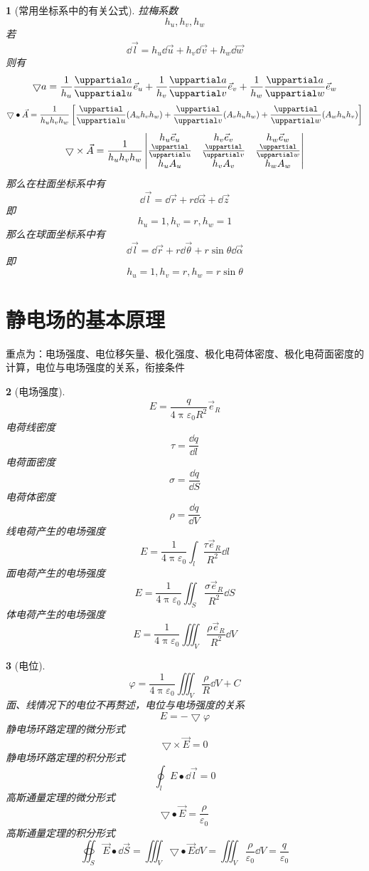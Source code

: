 \documentclass{book}
\theoremstyle{change}
\newtheorem{ti}{}[section]
\def\partial{\uppartial}
\begin{document}
\begin{ti}[常用坐标系中的有关公式]
	拉梅系数
	\[
		h_u,h_v,h_w
	\]
	若
	\[
		\dd \vec{l}=h_u\dd \vec{u}+h_v\dd \vec{v}+h_w\dd \vec{w}
	\]
	则有
	\[
		\bigtriangledown a=\frac1{h_u}\frac{\partial a}{\partial u}\vec{e}_u+\frac1{h_v}\frac{\partial a}{\partial v}\vec{e}_v+\frac1{h_w}\frac{\partial a}{\partial w}\vec{e}_w
	\]
	\[
		\bigtriangledown\bullet\vec{A}=\frac{1}{h_uh_vh_w}\left[\frac{\partial}{\partial u}(A_uh_vh_w)+\frac{\partial}{\partial v}(A_vh_uh_w)+\frac{\partial}{\partial w}(A_wh_uh_v)\right]
	\]
	\[
		\bigtriangledown\times\vec{A}=\frac{1}{h_uh_vh_w}
	\begin{vmatrix}
	h_u\vec{e}_u&h_v\vec{e}_v&h_w\vec{e}_w\\
	\frac{\partial}{\partial u}&\frac{\partial}{\partial v}&\frac{\partial}{\partial w}\\
	h_uA_u&h_vA_v&h_wA_w
	\end{vmatrix}
	\]
	那么在柱面坐标系中有
	\[
		\dd \vec{l}=\dd \vec{r}+r\dd \vec{\alpha}+\dd \vec{z}
	\]
	即
	\[
		h_u=1,h_v=r,h_w=1
	\]
	那么在球面坐标系中有
	\[
		\dd \vec{l}=\dd \vec{r}+r\dd \vec{\theta}+r\sin\theta\dd \vec{\alpha}
	\]
	即
	\[
		h_u=1,h_v=r,h_w=r\sin\theta
	\]
\end{ti}

\section{静电场的基本原理}
重点为：电场强度、电位移矢量、极化强度、极化电荷体密度、极化电荷面密度的计算，电位与电场强度的关系，衔接条件
\begin{ti}[电场强度]
\[
	E=\frac{q}{4\uppi\varepsilon_0R^2}\vec{e}_R
\]
电荷线密度
\[
	\tau=\frac{\dd q}{\dd l}
\]
电荷面密度
\[
	\sigma=\frac{\dd q}{\dd S}
\]
电荷体密度
\[
	\rho=\frac{\dd q}{\dd V}
\]
线电荷产生的电场强度
\[
	E=\frac{1}{4\uppi\varepsilon_0}\int_l{\frac{\tau\vec{e}_R}{R^2}}\dd l
\]
面电荷产生的电场强度
\[
	E=\frac{1}{4\uppi\varepsilon_0}\iint_S{\frac{\sigma\vec{e}_R}{R^2}}\dd S
	\]
体电荷产生的电场强度
\[
	E=\frac{1}{4\uppi\varepsilon_0}\iiint_{V}{\frac{\rho\vec{e}_R}{R^2}}\dd V
\]
\end{ti}

\begin{ti}[电位]
\[
	\varphi=\frac{1}{4\uppi\varepsilon_0}\iiint_{V}\frac{\rho}{R}\dd V+C
\]
面、线情况下的电位不再赘述，电位与电场强度的关系
\[
	E=-\bigtriangledown\varphi
\]
静电场环路定理的微分形式
\[
	\bigtriangledown\times\vec{E}=0
\]
静电场环路定理的积分形式
\[
	\oint_l{E\bullet\dd \vec{l}}=0
\]
高斯通量定理的微分形式
\[
	\bigtriangledown\bullet \vec{E}=\frac{\rho}{\varepsilon_0}
\]
高斯通量定理的积分形式
\[
	\oiint_{S}\vec{E}\bullet\dd \vec{S}=\iiint_{V}{\bigtriangledown\bullet\vec{E}}\dd V=\iiint_{V}{\frac{\rho}{\varepsilon_0}}\dd V=\frac{q}{\varepsilon_0}
\]
\end{ti}
\end{document}
